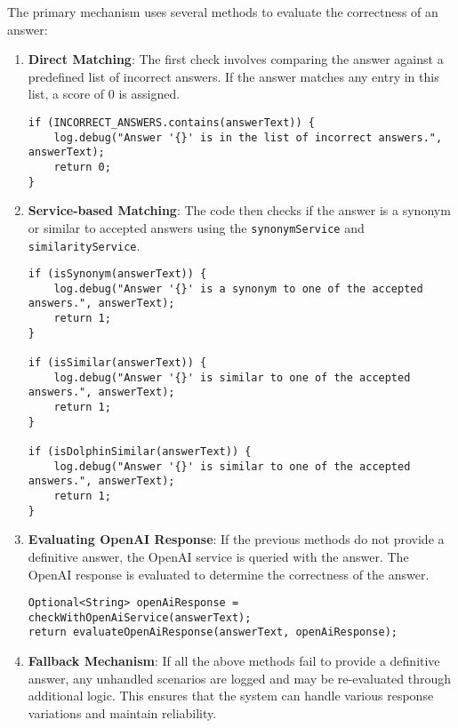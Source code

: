 The primary mechanism uses several methods to evaluate the correctness of an answer:
\begin{enumerate}
    \item \textbf{Direct Matching}:
    The first check involves comparing the answer against a predefined list of incorrect answers. If the answer matches any entry in this list, a score of 0 is assigned.

{\footnotesize
\begin{verbatim}
if (INCORRECT_ANSWERS.contains(answerText)) {
    log.debug("Answer '{}' is in the list of incorrect answers.", answerText);
    return 0;
}
\end{verbatim}
}

    \item \textbf{Service-based Matching}:
    The code then checks if the answer is a synonym or similar to accepted answers using the \texttt{synonymService} and \texttt{similarityService}.

{\footnotesize
\begin{verbatim}
if (isSynonym(answerText)) {
    log.debug("Answer '{}' is a synonym to one of the accepted answers.", answerText);
    return 1;
}

if (isSimilar(answerText)) {
    log.debug("Answer '{}' is similar to one of the accepted answers.", answerText);
    return 1;
}

if (isDolphinSimilar(answerText)) {
    log.debug("Answer '{}' is similar to one of the accepted answers.", answerText);
    return 1;
}
\end{verbatim}
}

    \item \textbf{Evaluating OpenAI Response}:
    If the previous methods do not provide a definitive answer, the OpenAI service is queried with the answer. The OpenAI response is evaluated to determine the correctness of the answer.

{\small
\begin{verbatim}
Optional<String> openAiResponse = checkWithOpenAiService(answerText);
return evaluateOpenAiResponse(answerText, openAiResponse);
\end{verbatim}
}

    \item \textbf{Fallback Mechanism}:
    If all the above methods fail to provide a definitive answer, any unhandled scenarios are logged and may be re-evaluated through additional logic. This ensures that the system can handle various response variations and maintain reliability.
\end{enumerate}

